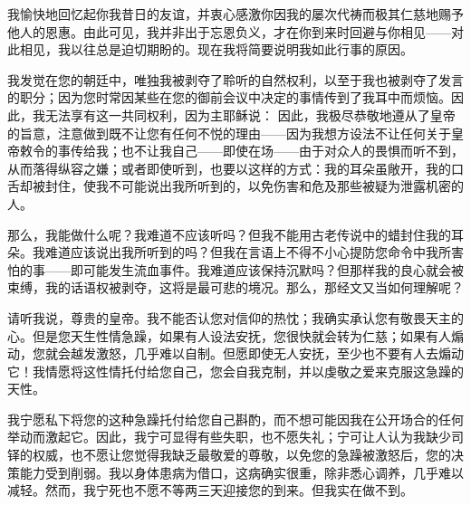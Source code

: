 \par

我愉快地回忆起你我昔日的友谊，并衷心感激你因我的屡次代祷而极其仁慈地赐予他人的恩惠。由此可见，我并非出于忘恩负义，才在你到来时回避与你相见——对此相见，我以往总是迫切期盼的。现在我将简要说明我如此行事的原因。\par

我发觉在您的朝廷中，唯独我被剥夺了聆听的自然权利，以至于我也被剥夺了发言的职分；因为您时常因某些在您的御前会议中决定的事情传到了我耳中而烦恼。因此，我无法享有这一共同权利，因为主耶稣说：  因此，我极尽恭敬地遵从了皇帝的旨意，注意做到既不让您有任何不悦的理由——因为我想方设法不让任何关于皇帝敕令的事传给我；也不让我自己——即使在场——由于对众人的畏惧而听不到，从而落得纵容之嫌；或者即使听到，也要以这样的方式：我的耳朵虽敞开，我的口舌却被封住，使我不可能说出我所听到的，以免伤害和危及那些被疑为泄露机密的人。\par

那么，我能做什么呢？我难道不应该听吗？但我不能用古老传说中的蜡封住我的耳朵。我难道应该说出我所听到的吗？但我在言语上不得不小心提防您命令中我所害怕的事——即可能发生流血事件。我难道应该保持沉默吗？但那样我的良心就会被束缚，我的话语权被剥夺，这将是最可悲的境况。那么，那经文又当如何理解呢？ \par

请听我说，尊贵的皇帝。我不能否认您对信仰的热忱；我确实承认您有敬畏天主的心。但是您天生性情急躁，如果有人设法安抚，您很快就会转为仁慈；如果有人煽动，您就会越发激怒，几乎难以自制。但愿即使无人安抚，至少也不要有人去煽动它！我情愿将这性情托付给您自己，您会自我克制，并以虔敬之爱来克服这急躁的天性。\par

我宁愿私下将您的这种急躁托付给您自己斟酌，而不想可能因我在公开场合的任何举动而激起它。因此，我宁可显得有些失职，也不愿失礼；宁可让人认为我缺少司铎的权威，也不愿让您觉得我缺乏最敬爱的尊敬，以免您的急躁被激怒后，您的决策能力受到削弱。我以身体患病为借口，这病确实很重，除非悉心调养，几乎难以减轻。然而，我宁死也不愿不等两三天迎接您的到来。但我实在做不到。\par

